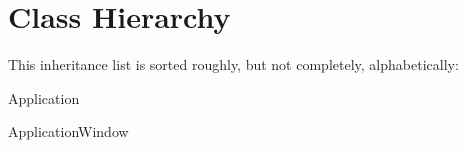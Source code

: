 \section{Class Hierarchy}
This inheritance list is sorted roughly, but not completely, alphabetically\-:\begin{DoxyCompactList}
\item Application\begin{DoxyCompactList}
\item {}
\end{DoxyCompactList}
\item Application\-Window\begin{DoxyCompactList}
\item {}
\end{DoxyCompactList}
\item {}
\end{DoxyCompactList}
